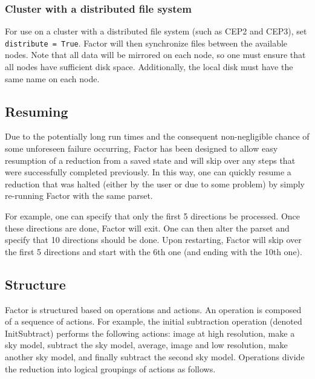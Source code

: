\documentclass[structabstract]{article}
\begin{document}
\subsubsection{Cluster with a distributed file system}
For use on a cluster with a distributed file system (such as CEP2 and CEP3), set
{\tt distribute = True}. Factor will then synchronize files between the
available nodes. Note that all data will be mirrored on each node, so one must
ensure that all nodes have sufficient disk space. Additionally, the local disk
must have the same name on each node.


\subsection{Resuming}
\label{factor:resuming}

Due to the potentially long run times and the consequent non-negligible chance
of some unforeseen failure occurring, Factor has been designed to allow easy
resumption of a reduction from a saved state and will skip over any steps that
were successfully completed previously. In this way, one can quickly resume a
reduction that was halted (either by the user or due to some problem) by simply
re-running Factor with the same parset.

For example, one can specify that only the first 5 directions be processed.
Once these directions are done, Factor will exit. One can then alter the parset
and specify that 10 directions should be done. Upon restarting, Factor will skip
over the first 5 directions and start with the 6th one (and ending with the 10th
one).


\subsection{Structure}
\label{factor:structure}

Factor is structured based on operations and actions. An operation is composed
of a sequence of actions. For example, the initial subtraction operation
(denoted InitSubtract) performs the following actions: image at high resolution,
make a sky model, subtract the sky model, average, image and low resolution,
make another sky model, and finally subtract the second sky model. Operations
divide the reduction into logical groupings of actions as follows.
\end{document}
